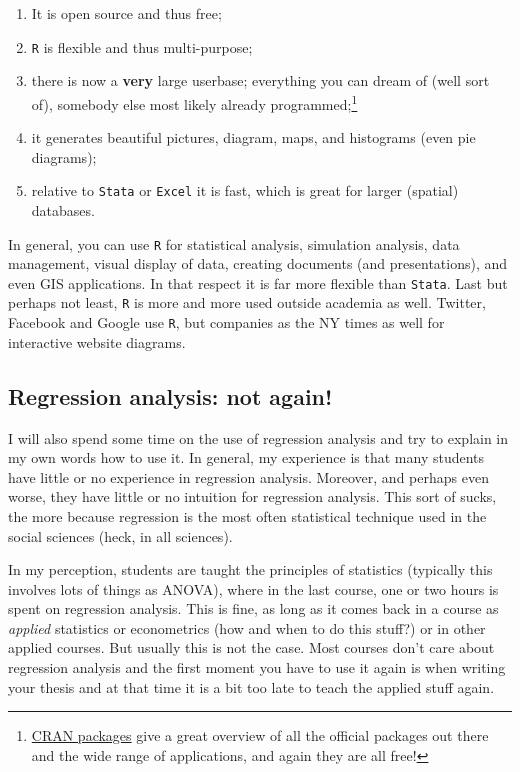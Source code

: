 \documentclass[]{article}
\providecommand{\tightlist}{%
  \setlength{\itemsep}{0pt}\setlength{\parskip}{0pt}}
\let\rmarkdownfootnote\footnote%
\def\footnote{\protect\rmarkdownfootnote}
\begin{document}
\begin{enumerate}
\def\labelenumi{\arabic{enumi}.}
\tightlist
\item
  It is open source and thus free;
\item
  \texttt{R} is flexible and thus multi-purpose;
\item
  there is now a \textbf{very} large userbase; everything you can dream
  of (well sort of), somebody else most likely already
  programmed;\footnote{\href{https://cran.r-project.org/web/packages/available_packages_by_name.html}{CRAN
    packages} give a great overview of all the official packages out
    there and the wide range of applications, and again they are all
    free!}
\item
  it generates beautiful pictures, diagram, maps, and histograms (even
  pie diagrams);
\item
  relative to \texttt{Stata} or \texttt{Excel} it is fast, which is
  great for larger (spatial) databases.
\end{enumerate}

In general, you can use \texttt{R} for statistical analysis, simulation
analysis, data management, visual display of data, creating documents
(and presentations), and even GIS applications. In that respect it is
far more flexible than \texttt{Stata}. Last but perhaps not least,
\texttt{R} is more and more used outside academia as well. Twitter,
Facebook and Google use \texttt{R}, but companies as the NY times as
well for interactive website diagrams.

\subsection{Regression analysis: not
again!}\label{regression-analysis-not-again}

I will also spend some time on the use of regression analysis and try to
explain in my own words how to use it. In general, my experience is that
many students have little or no experience in regression analysis.
Moreover, and perhaps even worse, they have little or no intuition for
regression analysis. This sort of sucks, the more because regression is
the most often statistical technique used in the social sciences (heck,
in all sciences).

In my perception, students are taught the principles of statistics
(typically this involves lots of things as ANOVA), where in the last
course, one or two hours is spent on regression analysis. This is fine,
as long as it comes back in a course as \emph{applied} statistics or
econometrics (how and when to do this stuff?) or in other applied
courses. But usually this is not the case. Most courses don't care about
regression analysis and the first moment you have to use it again is
when writing your thesis and at that time it is a bit too late to teach
the applied stuff again.
\end{document}

